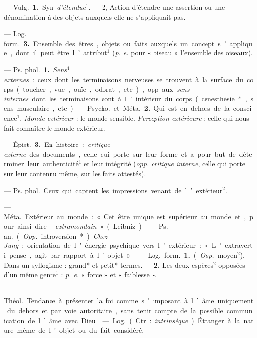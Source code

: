 \begin{itemize}[leftmargin=1cm, label=, itemsep=1pt]
 — \si{Vulg.} {\bf 1.} Syn. {\it d’étendue}$^1$.
— 2, Action d'étendre une assertion ou une dénomination à des
objets auxquels elle ne s’appliquait
pas.

— \si{Log. form.} {\bf 3.} Ensemble des êtres, objets ou faits auxquels un
concept s’applique, dont il peut être l’attribut$^1$ ({\it p. e.} pour
« oiseau » l’ensemble des oiseaux).

 — \si{Ps. phol.} {\bf 1.}
{\it Sens$^4$ externes} : ceux dont les terminaisons nerveuses se trouvent à
la surface du corps (toucher, vue,
ouïe, odorat, etc.), opp. aux {\it sens
internes} dont les terminaisons sont
à l'intérieur du corps (cénesthésie*,
sens musculaire, etc.).

— \si{Psycho.} et \si{Méta.} {\bf 2.} Qui est en
dehors de la conscience$^1$. {\it Monde extérieur} : le monde sensible.
{\it Perception extérieure} : celle qui nous fait
connaître le monde extérieur.

— \si{Épist.} {\bf 3.} En histoire : {\it critique
externe} des documents, celle qui porte sur leur forme et a pour but
de déterminer leur authenticité$^1$ et
leur intégrité ({\it opp.} {\it critique interne},
celle qui porte sur leur contennu même, sur les faits attestés).

 — \si{Ps. phol.}
Ceux qui captent les impressions venant de l’extérieur$^2$.

 — \si{Méta.} Extérieur au
monde : « Cet être unique est supérieur au monde et, pour ainsi dire,
{\it extramondain} » (Leibniz).

 — \si{Ps. an.} ({\it Opp.}
introversion*) {\it Chez Jung} : orientation de l'énergie psychique vers
l'extérieur : « L’extraverti pense, agit par rapport à l’objet. »

 — \si{Log.} \si{form.} {\bf 1.} ({\it Opp.}
moyen$^2$). Dans un syllogisme : grand* et petit* termes.
— {\bf 2.} Les deux espèces$^2$ opposées d’un même genre$^1$ :
{\it p. e.} « force » et « faiblesse ».

 — \si{Théol.} Tendance à présenter la foi comme
s'imposant à l’âme uniquement du dehors et par voie autoritaire, sans
tenir compte de la possible communication de l’âme avec Dieu.

 — \si{Log.} (Ctr. : {\it intrinsèque}) Étranger à la
nature même de l’objet ou du fait considéré.

	\end{itemize}
